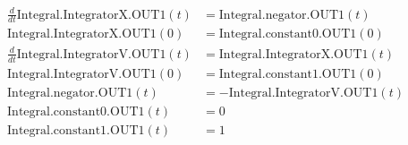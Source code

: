\documentclass{article}
\begin{document}
\[
\begin{aligned}
\frac{d}{dt} \mathrm{Integral.IntegratorX.OUT1}(t) &= \mathrm{Integral.negator.OUT1}(t) \\[4pt]
\mathrm{Integral.IntegratorX.OUT1}(0) &= \mathrm{Integral.constant0.OUT1}(0) \\[4pt]
\frac{d}{dt} \mathrm{Integral.IntegratorV.OUT1}(t) &= \mathrm{Integral.IntegratorX.OUT1}(t) \\[4pt]
\mathrm{Integral.IntegratorV.OUT1}(0) &= \mathrm{Integral.constant1.OUT1}(0) \\[4pt]
\mathrm{Integral.negator.OUT1}(t) &= -\mathrm{Integral.IntegratorV.OUT1}(t) \\[4pt]
\mathrm{Integral.constant0.OUT1}(t) &= 0 \\[4pt]
\mathrm{Integral.constant1.OUT1}(t) &= 1
\end{aligned}
\]
\end{document}

